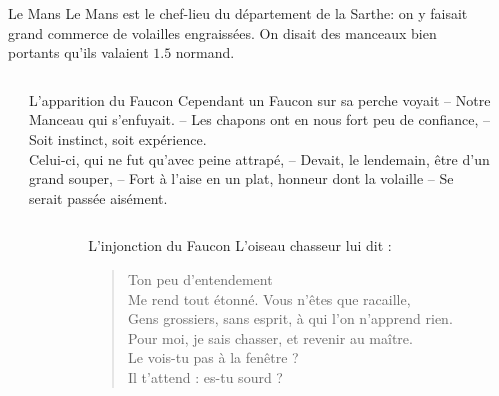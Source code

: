\documentclass{LaBRI_poster}
\begin{document}
\begin{frame}[t]
\begin{columns}[t]
\begin{column}{\twocolwidth}
\begin{alertblock}{Le Mans}
Le Mans est le chef-lieu du département de la Sarthe: on y faisait grand commerce de volailles engraissées. On disait des manceaux bien portants qu'ils valaient $1.5$ normand.
\end{alertblock}
\end{column}

\begin{column}{\sepwidth}\end{column}
\end{columns}



\begin{columns}[t] 

\begin{column}{\sepwidth}\end{column} %

\begin{column}{\onecolwidth}
\begin{block}{L'apparition du Faucon}
Cependant un Faucon sur sa perche voyait -- 
Notre Manceau qui s’enfuyait. -- 
Les chapons ont en nous fort peu de confiance, --  
Soit instinct, soit expérience.\\
Celui-ci, qui ne fut qu’avec peine attrapé, -- 
Devait, le lendemain, être d’un grand souper, -- 
Fort à l’aise en un plat, honneur dont la volaille -- 
Se serait passée aisément.
\end{block}
\end{column}

\begin{column}{\sepwidth}\end{column} %

\end{columns}



\begin{columns}[t]

\begin{column}{\sepwidth}\end{column} %

\begin{column}{\fourcolwidth}
\begin{block}{L'injonction du Faucon}
L’oiseau chasseur lui dit : 

\begin{quote} Ton peu d’entendement \\
Me rend tout étonné. Vous n’êtes que racaille, \\
Gens grossiers, sans esprit, à qui l’on n’apprend rien. \\
Pour moi, je sais chasser, et revenir au maître. \\
Le vois-tu pas à la fenêtre ? \\
Il t’attend : es-tu sourd ? 
\end{quote}
\end{block}



\end{column}
\end{columns}
\end{frame}
\end{document}
